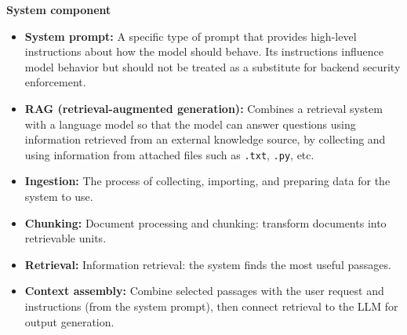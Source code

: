 \documentclass[a4paper,12pt]{report}
\begin{document}
\textbf{System component}
\begin{itemize}
    \item \textbf{System prompt:} A specific type of prompt that provides high-level instructions about how the model should behave. Its instructions influence model behavior but should not be treated as a substitute for backend security enforcement.

    \item \textbf{RAG (retrieval-augmented generation):} Combines a retrieval system with a language model so that the model can answer questions using information retrieved from an external knowledge source, by collecting and using information from attached files such as \texttt{.txt}, \texttt{.py}, etc.

    \item \textbf{Ingestion:} The process of collecting, importing, and preparing data for the system to use.

    \item \textbf{Chunking:} Document processing and chunking: transform documents into retrievable units.

    \item \textbf{Retrieval:} Information retrieval: the system finds the most useful passages.

    \item \textbf{Context assembly:} Combine selected passages with the user request and instructions (from the system prompt), then connect retrieval to the LLM for output generation.
\end{itemize}

\end{document}
